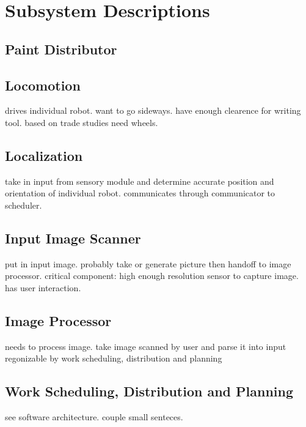 
\section{Subsystem Descriptions}
\label{sec:subsystem_descriptions}




\subsection{Paint Distributor}
\subsection{Locomotion} 
drives individual robot. want to go sideways. have enough clearence for writing tool. based on trade studies need wheels. 

\subsection{Localization}
take in input from sensory module and determine accurate position and orientation of individual robot. communicates through communicator to scheduler. 

\subsection{Input Image Scanner}
put in input image. probably take or generate picture then handoff to image processor. critical component: high enough resolution sensor to capture image. has user interaction. 

\subsection{Image Processor}
needs to process image. take image scanned by user and parse it into input regonizable by work scheduling, distribution and planning

\subsection{Work Scheduling, Distribution and Planning}
see software architecture. couple small senteces. 

